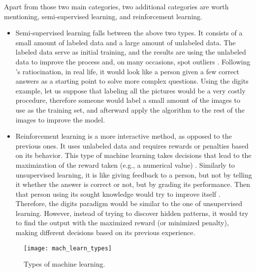 Apart from those two main categories, two additional categories are worth mentioning, semi-supervised learning, and reinforcement learning. \\
\begin{itemize}
\item Semi-supervised learning falls between the above two types. It consists of a small amount of labeled data and a large amount of unlabeled data. The labeled data serve as initial training, and the results are using the unlabeled data to improve the process and, on many occasions, spot outliers \autocite[25]{han}. Following \textcite{chapman}'s ratiocination, in real life, it would look like a person given a few correct answers as a starting point to solve more complex questions. Using the digits example, let us suppose that labeling all the pictures would be a very costly procedure, therefore someone would label a small amount of the images to use as the training set, and afterward apply the algorithm to the rest of the images to improve the model.
\item Reinforcement learning is a more interactive method, as opposed to the previous ones. It uses unlabeled data and requires rewards or penalties based on its behavior. This type of machine learning takes decisions that lead to the maximization of the reward taken (e.g., a numerical value) \autocite[2-3]{rein}. Similarly to unsupervised learning, it is like giving feedback to a person, but not by telling it whether the answer is correct or not, but by grading its performance. Then that person using its sought knowledge would try to improve itself \autocite[5]{chapman}. Therefore, the digits paradigm would be similar to the one of unsupervised learning. However, instead of trying to discover hidden patterns, it would try to find the output with the maximized reward (or minimized penalty), making different decisions based on its previous experience.
\end{itemize}

\begin{figure}[ht]
\texttt{[image: mach\_learn\_types]}
\caption{Types of machine learning.}
\label{fig:types}
\end{figure}

